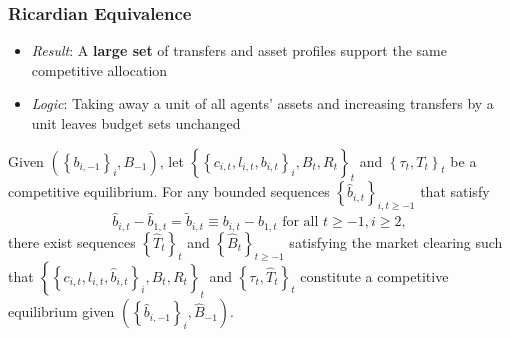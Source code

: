 \documentclass{beamer}
\begin{document}
%
%
%
%




\begin{frame}
 \frametitle{Ricardian Equivalence}
 \begin{itemize}
  \item \emph{Result}: A \textbf{large set} of transfers and asset profiles support the same competitive allocation
  \item \emph{Logic}: Taking away a unit of all agents' assets and increasing transfers by a unit leaves budget sets unchanged
 \end{itemize}
\begin{theorem}

Given $\left( \left \{ b_{i,-1}\right \}
_{i},B_{-1}\right) $, let $\left \{ \left \{ c_{i,t},l_{i,t},b_{i,t}\right \} _{i},B_{t},R_{t}\right \} _{t} $ and $\left \{ \tau _{t},T_{t}\right
\} _{t}$ be a competitive equilibrium. For any bounded sequences $%
\left \{ \hat{b}_{i,t}\right \} _{i,t\geq -1}$ that satisfy
\begin{equation*}
\hat{b}_{i,t}-\hat{b}_{1,t}=\tilde{b}_{i,t}\equiv b_{i,t}	-b_{1,t}\text{ for all }t\geq -1,i\geq 2,
\end{equation*}%
there exist  sequences $\left \{ \hat{T}_{t}\right \} _{t}$ and $%
\left \{ \hat{B}_{t}\right \} _{t\geq -1}$ satisfying the market clearing such that $\left \{ \left \{ c_{i,t},l_{i,t},\hat{b}%
_{i,t}\right \} _{i},\hat{B}_{t},R_{t}\right \} _{t}$ and $\left \{
\tau _{t},\hat{T}_{t}\right \} _{t}$ constitute a competitive
equilibrium given $\left( \left \{ \hat{b}_{i,-1}\right \} _{i},\hat{B}%
_{-1}\right) $.
\end{theorem}


\end{frame}
\end{document}
